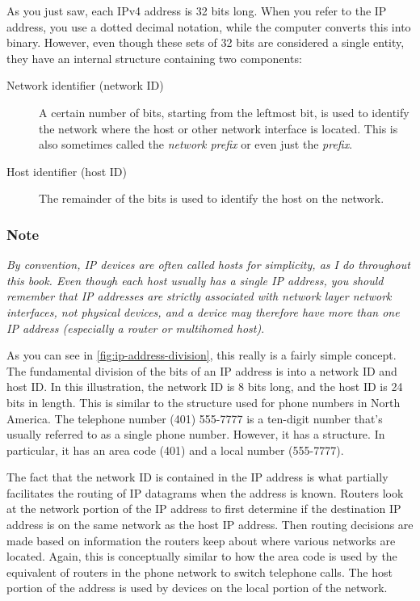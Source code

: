 As you just saw, each IPv4 address is 32 bits long.
When you refer to the IP address, you use a dotted decimal notation, while the computer converts
this into binary. However, even though these sets of 32 bits are
considered a single entity, they have an internal structure containing
two components:
\begin{description}
   \item[Network identifier (network ID)]
      A certain number of bits, starting from the leftmost bit, is used to identify the network where the host or other network interface is located. This is also sometimes called the \emph{network prefix} or even just the \emph{prefix}.
   \item[Host identifier (host ID)]
      The remainder of the bits is used to identify the host on the network.
\end{description}

\subsubsection[Note]{\texorpdfstring{\protect\hypertarget{ch16s03.htmlux5cux23note-62}{}{}Note}{Note}}

{\emph{By convention, IP devices are often called hosts for simplicity,
as I do throughout this book. Even though each host usually has a single
IP address, you should remember that IP addresses are strictly
associated with network layer network interfaces, not physical devices,
and a device may therefore have more than one IP address (especially a
router or multihomed host)}}.

As you can see in \cref{fig:ip-address-division},
this really is a fairly simple concept. The fundamental division of the
bits of an IP address is into a network ID and host ID. In this
illustration, the network ID is 8 bits long, and the host ID is 24 bits
in length. This is similar to the structure used for phone numbers in
North America. The telephone number (401) 555-7777 is a ten-digit number
that's usually referred to as a single phone number. However, it has a
structure. In particular, it has an area code (401) and a local number
(555-7777).

The fact that the network ID is contained in the IP address is what
partially facilitates the routing of IP datagrams when the address is
known. Routers look at the network portion of the IP address to first
determine if the destination IP address is on the same network as the
host IP address. Then routing decisions are made based on information
the routers keep about where various networks are located. Again, this
is conceptually similar to how the area code is used by the equivalent
of routers in the phone network to switch telephone calls. The host
portion of the address is used by devices on the local portion of the
network.

